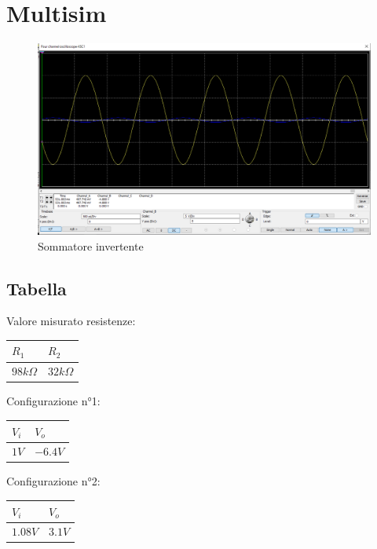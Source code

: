 \documentclass[12pt]{article}
\begin{document}
\section{Multisim}
\begin{figure}[h]
    \centering
    \includegraphics[scale=0.2]{Screenshot (3).png}
    \caption{Sommatore invertente}
\end{figure}
\subsection{Tabella}
Valore misurato resistenze:\\
\begin{center}
        \begin{tabular}{|p{2cm}|p{2cm}|}
            \hline
            \rowcolor{Green} $R_1$ & $R_2$ \\
            \hline
            \rowcolor{LimeGreen} $98k\Omega$ & $32k\Omega$  \\ 
            \hline
        \end{tabular}
        \label{Valore resistenze}
\end{center}
\noindent
Configurazione n°1:\\
\begin{center}
    \begin{tabular}{|p{2cm} |p{2cm}|}
        \hline
        \rowcolor{Green} $V_i$ & $V_o$  \\
        \hline
        \rowcolor{LimeGreen} $1V$ & $-6.4V$  \\ 
        \hline
    \end{tabular}
\end{center}


\noindent Configurazione n°2:\\
\begin{center}
    \begin{tabular}{|p{2cm} |p{2cm}|}
        \hline
        \rowcolor{Green} $V_i$ & $V_o$  \\
        \hline
        \rowcolor{LimeGreen} $1.08V$ & $3.1V$  \\ 
        \hline
    \end{tabular}
\end{center}
\end{document}
